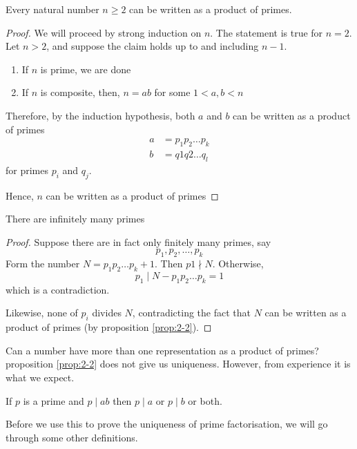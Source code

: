 \documentclass{article}
\begin{document}
\begin{nprop}\label{prop:2-2}
    Every natural number $n \geq 2$ can be written as a product of primes.
\end{nprop}

\begin{proof}
    We will proceed by strong induction on $n$. The statement is true for $n=2$. Let $n > 2$, and suppose the claim holds up to and including $n-1$.
    \begin{enumerate}[cases]
        \item If $n$ is prime, we are done
        \item If $n$ is composite, then, $n = ab$ for some $1 < a, b < n$
    \end{enumerate}
    Therefore, by the induction hypothesis, both $a$ and $b$ can be written as a product of primes
    \begin{align*}
        a &= p_1p_2 \ldots p_k \\
        b &= q1q2 \ldots q_l
    \end{align*}
    for primes $p_i$ and $q_j$.

    Hence, $n$ can be written as a product of primes
\end{proof}

\begin{nthm}
    There are infinitely many primes
\end{nthm}
\begin{proof}
    Suppose there are in fact only finitely many primes, say
    \[
        p_1, p_2, \ldots, p_k  
    \]
    Form the number $N = p_1p_2\ldots p_k + 1$. Then $p1 \nmid N$. Otherwise,
    \[
        p_1 \mid N - p_1p_2 \ldots p_k = 1
    \]
    which is a contradiction. \contradiction

    Likewise, none of $p_i$ divides $N$, contradicting the fact that $N$ can be written as a product of primes (by proposition \ref{prop:2-2}). \contradiction
\end{proof}

Can a number have more than one representation as a product of primes? proposition \ref{prop:2-2} does not give us uniqueness. However, from experience it is what we expect.

\begin{nprop}
    If $p$ is a prime and $p \mid ab$ then $p \mid a$ or $p \mid b$ or both.
\end{nprop}

Before we use this to prove the uniqueness of prime factorisation, we will go through some other definitions.
\end{document}
